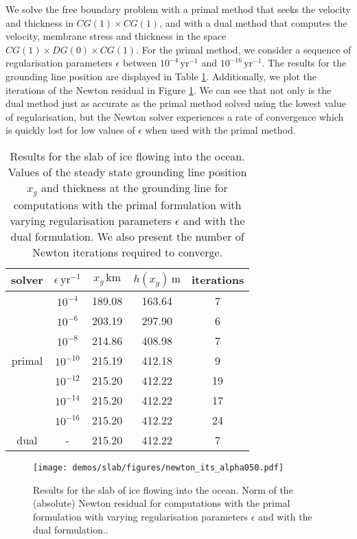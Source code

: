 \documentclass{article}
\theoremstyle{definition}
\theoremstyle{plain}
\begin{document}
We solve the free boundary problem with a primal method that seeks the velocity and thickness in $CG(1)\times CG(1)$, and with a dual method that computes the velocity, membrane stress and thickness in the space $CG(1)\times DG(0)\times CG(1)$. For the primal method, we consider a sequence of regularisation parameters $\epsilon$ between $10^{-4}\, \mathrm{yr}^{-1}$ and $10^{-16}\,\mathrm{yr}^{-1}$. The results for the grounding line position are displayed in Table \ref{tab:slab}. Additionally, we plot the iterations of the Newton residual in Figure \ref{fig:newton-its}. We can see that not only is the dual method just as accurate as the primal method solved using the lowest value of regularisation, but the Newton solver experiences a rate of convergence which is quickly lost for low values of $\epsilon$ when used with the primal method.

\begin{table}[t]
\centering
\caption{Results for the slab of ice flowing into the ocean. Values of the steady state grounding line position $x_g$ and thickness at the grounding line for computations with the primal formulation with varying regularisation parameters $\epsilon$ and with the dual formulation. We also present the number of Newton iterations required to converge.}
\label{tab:slab}
\begin{tabular}{ccccc}
\toprule
solver & $\epsilon\,\mathrm{yr}^{-1}$ & $x_g\,\mathrm{km}$ & $h(x_g)\,\mathrm{m}$ & iterations \\ 
\midrule
\multirow{7}{*}{primal} & $10^{-4}$ & 189.08 & 163.64 & 7  \\ 
 & $10^{-6}$ & 203.19 & 297.90 & 6  \\ 
 & $10^{-8}$ & 214.86 & 408.98 & 7  \\ 
 & $10^{-10}$ & 215.19 & 412.18 & 9  \\ 
 & $10^{-12}$ & 215.20 & 412.22 & 19  \\ 
 & $10^{-14}$ & 215.20 & 412.22 & 17  \\ 
 & $10^{-16}$ & 215.20 & 412.22 & 24  \\ 
\midrule
dual & - & 215.20 & 412.22 & 7 \\
\bottomrule
\end{tabular}
\end{table} 

\begin{figure}[t]
	\centering
	\texttt{[image: demos/slab/figures/newton\_its\_alpha050.pdf]}
	\caption{Results for the slab of ice flowing into the ocean. Norm of the (absolute) Newton residual for computations with the primal formulation with varying regularisation parameters $\epsilon$ and with the dual formulation..}
	\label{fig:newton-its}
\end{figure}
\end{document}
